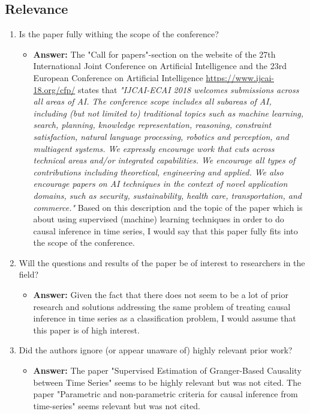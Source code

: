 \documentclass[a4paper]{article}
\begin{document}
\subsection{Relevance}




\begin{enumerate}[label=(\alph*)]
	\item Is the paper fully withing the scope of the conference?
		\begin{itemize}
			\item \textbf{Answer:}	The "Call for papers"-section on the website of the 27th International Joint Conference on Artificial Intelligence and the 23rd European Conference on Artificial Intelligence \url{https://www.ijcai-18.org/cfp/} states that \textit{"IJCAI-ECAI 2018 welcomes submissions across all areas of AI. The conference scope includes all subareas of AI, including (but not limited to) traditional topics such as machine learning, search, planning, knowledge representation, reasoning, constraint satisfaction, natural language processing, robotics and perception, and multiagent systems. We expressly encourage work that cuts across technical areas and/or integrated capabilities. We encourage all types of contributions including theoretical, engineering and applied. We also encourage papers on AI techniques in the context of novel application domains, such as security, sustainability, health care, transportation, and commerce."} Based on this description and the topic of the paper which is about using supervised (machine) learning techniques in order to do causal inference in time series, I would say that this paper fully fits into the scope of the conference.
		\end{itemize}				
		
		
	\item Will the questions and results of the paper be of interest to researchers in the field?
		\begin{itemize}
			\item \textbf{Answer:} Given the fact that there does not seem to be a lot of prior research and solutions addressing the same problem of treating causal inference in time series as a classification problem, I would assume that this paper is of high interest.
		\end{itemize}			
	
	
	\item Did the authors ignore (or appear unaware of) highly relevant prior work?
		\begin{itemize}
			\item \textbf{Answer:} The paper "Supervised Estimation of Granger-Based Causality between Time Series" \cite{benozzo2017supervised} seems to be highly relevant but was not cited. The paper "Parametric and non-parametric criteria for causal inference from time-series" \cite{chicharro2014parametric} seems relevant but was not cited.
		\end{itemize}			
	

\end{enumerate}
\end{document}
